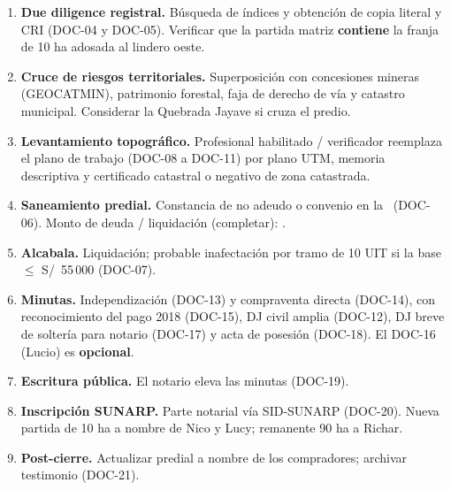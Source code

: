 \documentclass[12pt,a4paper]{article}
\begin{document}
\begin{enumerate}[leftmargin=1.15cm, itemsep=0.28em]
\item \textbf{Due diligence registral.} Búsqueda de índices y obtención de copia literal y CRI (DOC-04 y DOC-05). Verificar que la partida matriz \textbf{contiene} la franja de 10 ha adosada al lindero oeste.
\item \textbf{Cruce de riesgos territoriales.} Superposición con concesiones mineras (GEOCATMIN), patrimonio forestal, faja de derecho de vía y catastro municipal. Considerar la Quebrada Jayave si cruza el predio.
\item \textbf{Levantamiento topográfico.} Profesional habilitado / verificador reemplaza el plano de trabajo (DOC-08 a DOC-11) por plano UTM, memoria descriptiva y certificado catastral o negativo de zona catastrada.
\item \textbf{Saneamiento predial.} Constancia de no adeudo o convenio en la \Municipalidad\ (DOC-06). Monto de deuda / liquidación (completar): \DeudaPredialReferencia.
\item \textbf{Alcabala.} Liquidación; probable inafectación por tramo de 10 UIT si la base $\leq$ S/\ 55\,000 (DOC-07).
\item \textbf{Minutas.} Independización (DOC-13) y compraventa directa (DOC-14), con reconocimiento del pago 2018 (DOC-15), DJ civil amplia (DOC-12), DJ breve de soltería para notario (DOC-17) y acta de posesión (DOC-18). El DOC-16 (Lucio) es \textbf{opcional}.
\item \textbf{Escritura pública.} El notario eleva las minutas (DOC-19).
\item \textbf{Inscripción SUNARP.} Parte notarial vía SID-SUNARP (DOC-20). Nueva partida de 10 ha a nombre de Nico y Lucy; remanente 90 ha a Richar.
\item \textbf{Post-cierre.} Actualizar predial a nombre de los compradores; archivar testimonio (DOC-21).
\end{enumerate}
\end{document}
